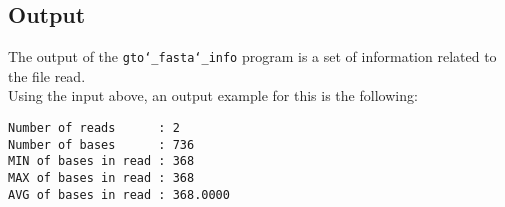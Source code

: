 \subsection*{Output}
The output of the \texttt{gto\char`_fasta\char`_info} program is a set of information related to the file read. \\
Using the input above, an output example for this is the following:
\begin{lstlisting}
Number of reads      : 2
Number of bases      : 736
MIN of bases in read : 368
MAX of bases in read : 368
AVG of bases in read : 368.0000
\end{lstlisting}